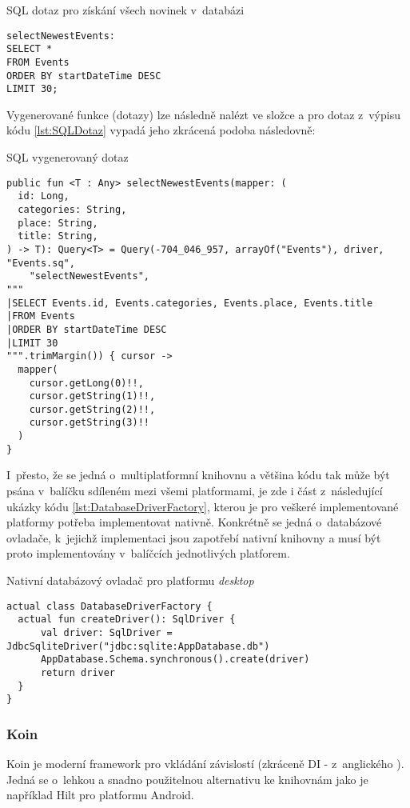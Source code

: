 \begin{listing}[H]
\caption{SQL dotaz pro získání všech novinek v~databázi}\label{lst:SQLDotaz}
\begin{verbatim}
selectNewestEvents:
SELECT *
FROM Events
ORDER BY startDateTime DESC
LIMIT 30;
\end{verbatim}
\end{listing}

Vygenerované funkce (dotazy) lze následně nalézt ve složce  a pro dotaz z~výpisu kódu \ref{lst:SQLDotaz}
vypadá jeho zkrácená podoba následovně:

\begin{listing}[H]
\caption{SQL vygenerovaný dotaz}\label{lst:SQLGeneratedDotaz}
\begin{verbatim}
public fun <T : Any> selectNewestEvents(mapper: (
  id: Long,
  categories: String,
  place: String,
  title: String,
) -> T): Query<T> = Query(-704_046_957, arrayOf("Events"), driver, "Events.sq",
    "selectNewestEvents", 
"""
|SELECT Events.id, Events.categories, Events.place, Events.title
|FROM Events
|ORDER BY startDateTime DESC
|LIMIT 30
""".trimMargin()) { cursor ->
  mapper(
    cursor.getLong(0)!!,
    cursor.getString(1)!!,
    cursor.getString(2)!!,
    cursor.getString(3)!!
  )
}
\end{verbatim}
\end{listing}

I~přesto, že se jedná o~multiplatformní knihovnu a většina kódu tak může být psána v~balíčku sdíleném mezi všemi platformami, je zde i 
část z~následující ukázky kódu \ref{lst:DatabaseDriverFactory}, kterou je pro veškeré implementované platformy potřeba implementovat
nativně. Konkrétně se jedná o~databázové ovladače, k~jejichž implementaci jsou 
zapotřebí nativní knihovny a musí být proto implementovány v~balíčcích jednotlivých platforem.

\begin{listing}[H]
\caption{Nativní databázový ovladač pro platformu \textit{desktop}}\label{lst:DatabaseDriverFactory}
\begin{verbatim}
actual class DatabaseDriverFactory {
  actual fun createDriver(): SqlDriver {
      val driver: SqlDriver = JdbcSqliteDriver("jdbc:sqlite:AppDatabase.db")
      AppDatabase.Schema.synchronous().create(driver)
      return driver
  }
}
\end{verbatim}
\end{listing}

\subsubsection*{Koin}
Koin je moderní framework pro vkládání závislostí (zkráceně DI - z~anglického ). Jedná se o~lehkou a snadno 
použitelnou alternativu ke knihovnám jako je například Hilt pro platformu Android.

